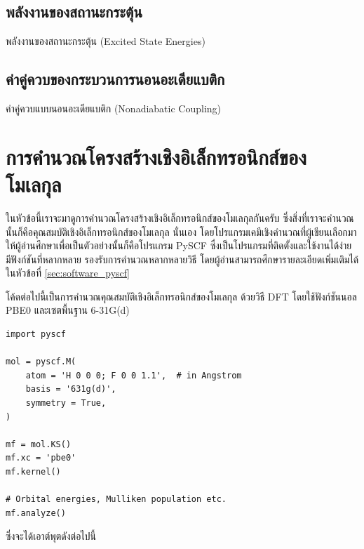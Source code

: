 \subsection{พลังงานของสถานะกระตุ้น}
\label{ssec:ex_ener}

พลังงานของสถานะกระตุ้น (Excited State Energies)

\subsection{ค่าคู่ควบของกระบวนการนอนอะเดียแบติก}
\label{ssec:nonadia_ener}

ค่าคู่ควบแบบนอนอะเดียแบติก (Nonadiabatic Coupling)

\section{การคำนวณโครงสร้างเชิงอิเล็กทรอนิกส์ของโมเลกุล}
\label{sec:comp_elec_strct}

ในหัวข้อนี้เราจะมาดูการคำนวณโครงสร้างเชิงอิเล็กทรอนิกส์ของโมเลกุลกันครับ ซึ่งสิ่งที่เราจะคำนวณนั้นก็คือคุณสมบัติเชิงอิเล็กทรอนิกส์ของโมเลกุล%
นั่นเอง โดยโปรแกรมเคมีเชิงคำนวณที่ผู้เขียนเลือกมาให้ผู้อ่านศึกษาเพื่อเป็นตัวอย่างนั้นก็คือโปรแกรม PySCF ซึ่งเป็นโปรแกรมที่ติดตั้งและใช้งานได้ง่าย
มีฟังก์ชันที่หลากหลาย รองรับการคำนวณหลากหลายวิธี โดยผู้อ่านสามารถศึกษารายละเอียดเพิ่มเติมได้ในหัวข้อที่ \ref{sec:software_pyscf}

โค้ดต่อไปนี้เป็นการคำนวณคุณสมบัติเชิงอิเล็กทรอนิกส์ของโมเลกุล  ด้วยวิธี DFT โดยใช้ฟังก์ชันนอล PBE0 และเซตพื้นฐาน 6-31G(d)

\begin{lstlisting}[style=MyPython]
import pyscf

mol = pyscf.M(
    atom = 'H 0 0 0; F 0 0 1.1',  # in Angstrom
    basis = '631g(d)',
    symmetry = True,
)

mf = mol.KS()
mf.xc = 'pbe0'
mf.kernel()

# Orbital energies, Mulliken population etc.
mf.analyze()
\end{lstlisting}

\vspace{1em}
\noindent ซึ่งจะได้เอาต์พุตดังต่อไปนี้

